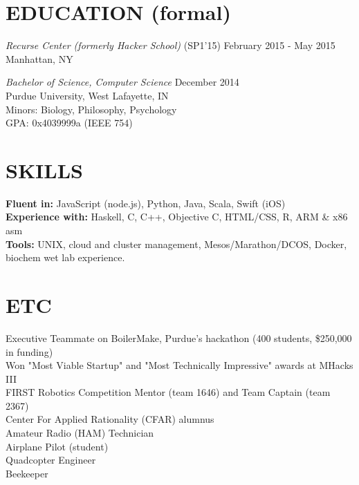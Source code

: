 \documentclass[margin,4pt]{res} %
\begin{document}
\begin{resume}
\section{EDUCATION (formal)}
	{\sl Recurse Center (formerly Hacker School)} \hfill (SP1'15) February 2015 - May 2015\\
		Manhattan, NY

	{\sl Bachelor of Science, Computer Science }\hfill  December 2014\\
		Purdue University, West Lafayette, IN\\
		Minors: Biology, Philosophy, Psychology \\
		GPA: 0x4039999a (IEEE 754)


\section{SKILLS} 
	{\bf Fluent in:} JavaScript (node.js), Python, Java, Scala, Swift (iOS)\\
 	{\bf Experience with:} Haskell, C, C++, Objective C, HTML/CSS, R, ARM \& x86 asm\\
	{\bf Tools:} UNIX, cloud and cluster management, Mesos/Marathon/DCOS, Docker, biochem wet lab experience.


\section{ETC}  
	Executive Teammate on BoilerMake, Purdue's hackathon (400 students, \$250,000 in funding)\\
	Won "Most Viable Startup" and "Most Technically Impressive" awards at MHacks III\\
	FIRST Robotics Competition Mentor (team 1646) and Team Captain (team 2367)\\
	Center For Applied Rationality (CFAR) alumnus\\
	Amateur Radio (HAM) Technician\\
	Airplane Pilot (student)\\
	Quadcopter Engineer\\
	Beekeeper\\


\end{resume}
\end{document}
